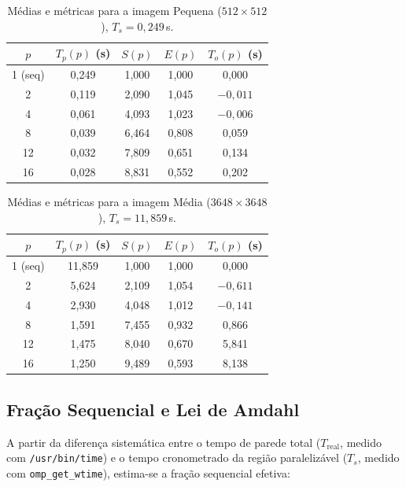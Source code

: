 \documentclass[12pt]{article}
\begin{document}
\begin{table}[ht]
	\centering
	\caption{Médias e métricas para a imagem Pequena ($512 \times 512$), $T_s = 0{,}249$\,s.}
	\label{tab:tempos_pequena}
	\begin{tabular}{ccccc}
		\toprule
		$p$     & $T_p(p)$ (s) & $S(p)$ & $E(p)$ & $T_o(p)$ (s) \\
		\midrule
		1 (seq) & 0,249        & 1,000  & 1,000  & 0,000        \\
		2       & 0,119        & 2,090  & 1,045  & $-0,011$     \\
		4       & 0,061        & 4,093  & 1,023  & $-0,006$     \\
		8       & 0,039        & 6,464  & 0,808  & 0,059        \\
		12      & 0,032        & 7,809  & 0,651  & 0,134        \\
		16      & 0,028        & 8,831  & 0,552  & 0,202        \\
		\bottomrule
	\end{tabular}
\end{table}

\begin{table}[ht]
	\centering
	\caption{Médias e métricas para a imagem Média ($3648 \times 3648$), $T_s = 11{,}859$\,s.}
	\label{tab:tempos_media}
	\begin{tabular}{ccccc}
		\toprule
		$p$     & $T_p(p)$ (s) & $S(p)$ & $E(p)$ & $T_o(p)$ (s) \\
		\midrule
		1 (seq) & 11,859       & 1,000  & 1,000  & 0,000        \\
		2       & 5,624        & 2,109  & 1,054  & $-0,611$     \\
		4       & 2,930        & 4,048  & 1,012  & $-0,141$     \\
		8       & 1,591        & 7,455  & 0,932  & 0,866        \\
		12      & 1,475        & 8,040  & 0,670  & 5,841        \\
		16      & 1,250        & 9,489  & 0,593  & 8,138        \\
		\bottomrule
	\end{tabular}
\end{table}




\subsection{Fração Sequencial e Lei de Amdahl}

A partir da diferença sistemática entre o tempo de parede total ($T_{\text{real}}$,
medido com \texttt{/usr/bin/time}) e o tempo cronometrado da região paralelizável
($T_s$, medido com \texttt{omp\_get\_wtime}), estima-se a fração sequencial efetiva:
\end{document}
